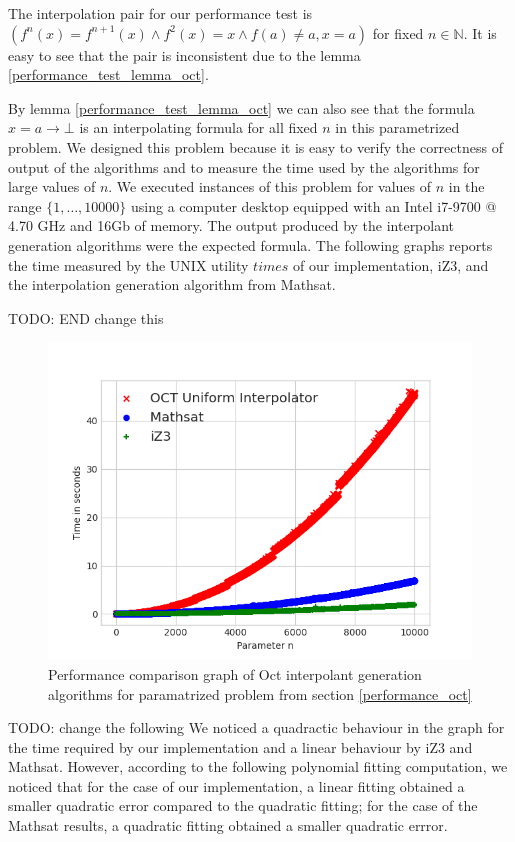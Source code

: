 The interpolation pair for our performance test 
is $(f^n(x) = f^{n+1}(x) \land f^2(x) = x \land f(a) \neq a, x = a)$
for fixed $n \in \mathbb{N}$.
It is easy to see that the pair is inconsistent due to the lemma 
\ref{performance_test_lemma_oct}. 

By lemma \ref{performance_test_lemma_oct}
we can also see that the formula $x = a \rightarrow \bot$ is an 
interpolating formula for all fixed $n$ in this parametrized problem.
We designed this problem because it is easy to verify the 
correctness of output of the algorithms and to measure 
the time used by the algorithms for large values of $n$. 
We executed instances of this problem for values of $n$
in the range $\{1, \dots, 10000\}$ using a computer desktop
equipped with an Intel i7-9700 @ 4.70 GHz and 16Gb of memory. 
The output produced by the interpolant generation algorithms
were the expected formula.
The following graphs reports the time measured by the UNIX
utility $times$ of our implementation, iZ3, and the interpolation 
generation algorithm from Mathsat.

TODO: END change this

\begin{figure}
  \centering
  \includegraphics[scale=0.9]{figures/octi_performance_graph}
  \caption{Performance comparison graph of Oct interpolant generation
  algorithms for paramatrized problem from section \ref{performance_oct}} 
  \label{performance_graph_euf}
\end{figure}

TODO: change the following
We noticed a quadractic behaviour in the graph for the time 
required by our implementation
and a linear behaviour by iZ3 and Mathsat. However, 
according to the following polynomial 
fitting computation, 
we noticed that for the case of our implementation, 
a linear fitting obtained a smaller 
quadratic error compared to the quadratic fitting;  
for the case of the Mathsat
results, a quadratic fitting obtained a smaller 
quadratic errror.

